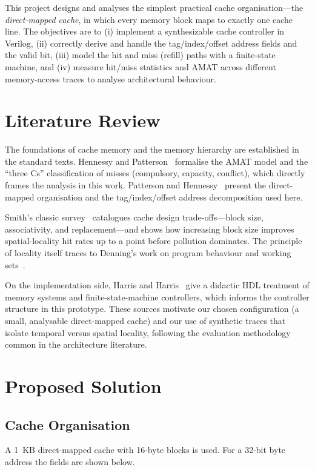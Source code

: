\documentclass[conference]{IEEEtran}
\begin{document}
This project designs and analyses the simplest practical cache
organisation---the \emph{direct-mapped cache}, in which every memory block maps
to exactly one cache line. The objectives are to (i) implement a synthesizable
cache controller in Verilog, (ii) correctly derive and handle the
tag/index/offset address fields and the valid bit, (iii) model the hit and miss
(refill) paths with a finite-state machine, and (iv) measure hit/miss
statistics and AMAT across different memory-access traces to analyse
architectural behaviour.

\section{Literature Review}
The foundations of cache memory and the memory hierarchy are established in the
standard texts. Hennessy and Patterson~\cite{hennessy} formalise the AMAT model
and the ``three Cs'' classification of misses (compulsory, capacity, conflict),
which directly frames the analysis in this work. Patterson and
Hennessy~\cite{patterson} present the direct-mapped organisation and the
tag/index/offset address decomposition used here.

Smith's classic survey~\cite{smith} catalogues cache design trade-offs---block
size, associativity, and replacement---and shows how increasing block size
improves spatial-locality hit rates up to a point before pollution dominates.
The principle of locality itself traces to Denning's work on program behaviour
and working sets~\cite{denning}.

On the implementation side, Harris and Harris~\cite{harris} give a didactic HDL
treatment of memory systems and finite-state-machine controllers, which informs
the controller structure in this prototype. These sources motivate our chosen
configuration (a small, analysable direct-mapped cache) and our use of synthetic
traces that isolate temporal versus spatial locality, following the evaluation
methodology common in the architecture literature.

\section{Proposed Solution}

\subsection{Cache Organisation}
A 1~KB direct-mapped cache with 16-byte blocks is used. For a 32-bit byte
address the fields are shown below.
\end{document}
